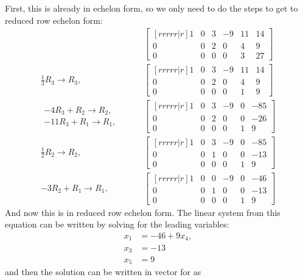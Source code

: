 \begin{example}
First, this is already in echelon form, so we only need to do the steps to get to reduced row echelon form:
\begin{align*}
& \qquad
\begin{bmatrix}[rrrrr|r]
1 & 0 & 3 & -9 & 11 & 14 \\
0 & 0 & 2 & 0 & 4 & 9 \\
0 & 0 & 0 & 0 & 3 & 27
\end{bmatrix} \\
\frac{1}{3} R_3 \rightarrow R_3, & \qquad
\begin{bmatrix}[rrrrr|r]
1 & 0 & 3 & -9 & 11 & 14 \\
0 & 0 & 2 & 0 & 4 & 9 \\
0 & 0 & 0 & 0 & 1 & 9
\end{bmatrix} \\
\begin{array}{r}
-4 R_3 + R_2 \rightarrow R_2, \\
-11R_3 + R_1 \rightarrow R_1,
\end{array} & \qquad
\begin{bmatrix}[rrrrr|r]
1 & 0 & 3 & -9 & 0 & -85 \\
0 & 0 & 2 & 0 & 0 & -26 \\
0 & 0 & 0 & 0 & 1 & 9
\end{bmatrix} \\
\frac{1}{2} R_2 \rightarrow R_2, & \qquad
\begin{bmatrix}[rrrrr|r]
1 & 0 & 3 & -9 & 0 & -85 \\
0 & 0 & 1 & 0 & 0 & -13 \\
0 & 0 & 0 & 0 & 1 & 9
\end{bmatrix} \\
-3R_2 + R_1 \rightarrow R_1, & \qquad
\begin{bmatrix}[rrrrr|r]
1 & 0 & 0 & -9 & 0 & -46 \\
0 & 0 & 1 & 0 & 0 & -13 \\
0 & 0 & 0 & 0 & 1 & 9
\end{bmatrix}
\end{align*}
And now this is in reduced row echelon form.  The linear system from this equation can be written by solving for the leading variables:
%
\begin{align*}
x_1 & = -46 + 9x_4, \\
x_3 & = -13 \\
x_5 & = 9
\end{align*}
and then the solution can be written in vector for as
%
\begin{align*}

\end{align*}
\end{example}

